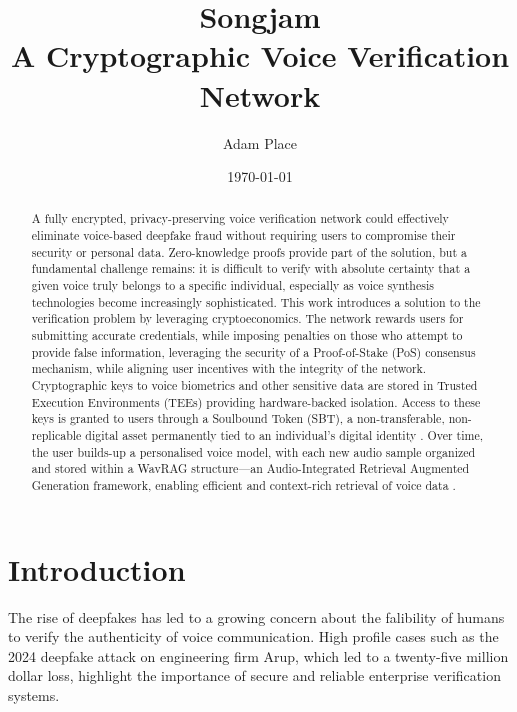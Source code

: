 \documentclass[11pt,a4paper]{article}
\title{Songjam\\[0.5em]\large A Cryptographic Voice Verification Network}
\author{Adam Place}
\date{\today}
\begin{document}
\maketitle
\thispagestyle{fancy} %
\pagestyle{fancy}
\fancyhf{} %
\fancyfoot[L]{\thepage} %
\renewcommand{\headrulewidth}{0pt} %
\renewcommand{\footrulewidth}{0.4pt} %

\begin{abstract}
A fully encrypted, privacy-preserving voice verification network could effectively eliminate voice-based deepfake fraud without requiring users to compromise their security or personal data.
Zero-knowledge proofs provide part of the solution, but a fundamental challenge remains: it is difficult to verify with absolute certainty that a given voice truly belongs to a specific individual, especially as voice synthesis technologies become increasingly sophisticated.
This work introduces a solution to the verification problem by leveraging cryptoeconomics.
The network rewards users for submitting accurate credentials, while imposing penalties on those who attempt to provide false information, leveraging the security of a Proof-of-Stake (PoS) consensus mechanism, while aligning user incentives with the integrity of the network.
Cryptographic keys to voice biometrics and other sensitive data are stored in Trusted Execution Environments (TEEs) providing hardware-backed isolation.
Access to these keys is granted to users through a Soulbound Token (SBT), a non-transferable, non-replicable digital asset permanently tied to an individual's digital identity \cite{buterin2022soulbound}.
Over time, the user builds-up a personalised voice model, with each new audio sample organized and stored within a WavRAG structure---an Audio-Integrated Retrieval Augmented Generation framework, enabling efficient and context-rich retrieval of voice data \cite{chen2025wavrag}.
\end{abstract}

\section{Introduction}
\label{sec:introduction}
The rise of deepfakes has led to a growing concern about the falibility of humans to verify the authenticity of voice communication.
High profile cases such as the 2024 deepfake attack on engineering firm Arup, which led to a twenty-five million dollar loss, highlight the importance of secure and reliable enterprise verification systems.
\end{document}
